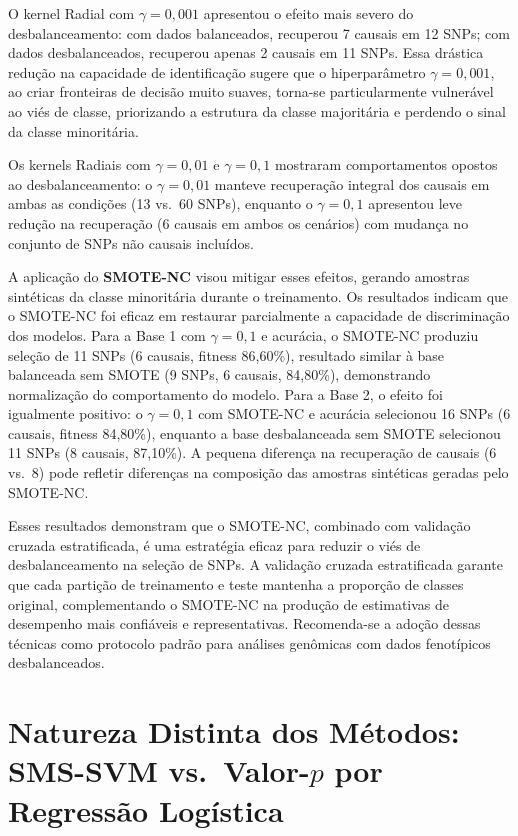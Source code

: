 \documentclass[
    12pt,
    a4paper,
    oneside,
    english,
    french,
    spanish,
    brazil
    ]{abntex2}
\newcommand{\novo}[1]{\textcolor{corNova}{#1}}
\begin{document}
\novo{O kernel Radial com $\gamma = 0{,}001$ apresentou o efeito mais severo do desbalanceamento: com dados balanceados, recuperou 7 causais em 12 SNPs; com dados desbalanceados, recuperou apenas 2 causais em 11 SNPs. Essa drástica redução na capacidade de identificação sugere que o hiperparâmetro $\gamma = 0{,}001$, ao criar fronteiras de decisão muito suaves, torna-se particularmente vulnerável ao viés de classe, priorizando a estrutura da classe majoritária e perdendo o sinal da classe minoritária.}

\novo{Os kernels Radiais com $\gamma = 0{,}01$ e $\gamma = 0{,}1$ mostraram comportamentos opostos ao desbalanceamento: o $\gamma = 0{,}01$ manteve recuperação integral dos causais em ambas as condições (13 vs.\ 60 SNPs), enquanto o $\gamma = 0{,}1$ apresentou leve redução na recuperação (6 causais em ambos os cenários) com mudança no conjunto de SNPs não causais incluídos.}

\novo{A aplicação do \textbf{SMOTE-NC} visou mitigar esses efeitos, gerando amostras sintéticas da classe minoritária durante o treinamento. Os resultados indicam que o SMOTE-NC foi eficaz em restaurar parcialmente a capacidade de discriminação dos modelos. Para a Base 1 com $\gamma = 0{,}1$ e acurácia, o SMOTE-NC produziu seleção de 11 SNPs (6 causais, fitness 86,60\%), resultado similar à base balanceada sem SMOTE (9 SNPs, 6 causais, 84,80\%), demonstrando normalização do comportamento do modelo. Para a Base 2, o efeito foi igualmente positivo: o $\gamma = 0{,}1$ com SMOTE-NC e acurácia selecionou 16 SNPs (6 causais, fitness 84,80\%), enquanto a base desbalanceada sem SMOTE selecionou 11 SNPs (8 causais, 87,10\%). A pequena diferença na recuperação de causais (6 vs.\ 8) pode refletir diferenças na composição das amostras sintéticas geradas pelo SMOTE-NC.}

\novo{Esses resultados demonstram que o SMOTE-NC, combinado com validação cruzada estratificada, é uma estratégia eficaz para reduzir o viés de desbalanceamento na seleção de SNPs. A validação cruzada estratificada garante que cada partição de treinamento e teste mantenha a proporção de classes original, complementando o SMOTE-NC na produção de estimativas de desempenho mais confiáveis e representativas. Recomenda-se a adoção dessas técnicas como protocolo padrão para análises genômicas com dados fenotípicos desbalanceados.}

\chapter*{Natureza Distinta dos Métodos: SMS-SVM vs.\ Valor-$p$ por Regressão Logística}
\end{document}
